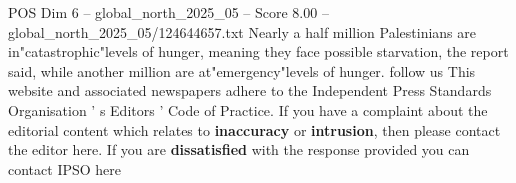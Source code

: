 \begin{textsample}{POS Dim 6 – global\_north\_2025\_05 – Score 8.00 – global\_north\_2025\_05/124644657.txt}
Nearly a half million Palestinians are in"catastrophic"levels of hunger, meaning they face possible starvation, the report said, while another million are at"emergency"levels of hunger. follow us This website and associated newspapers adhere to the Independent Press Standards Organisation ' s Editors ' Code of Practice.
If you have a complaint about the editorial content which relates to \textbf{inaccuracy} or \textbf{intrusion}, then please contact the editor here.
If you are \textbf{dissatisfied} with the response provided you can contact IPSO here

\end{textsample}
